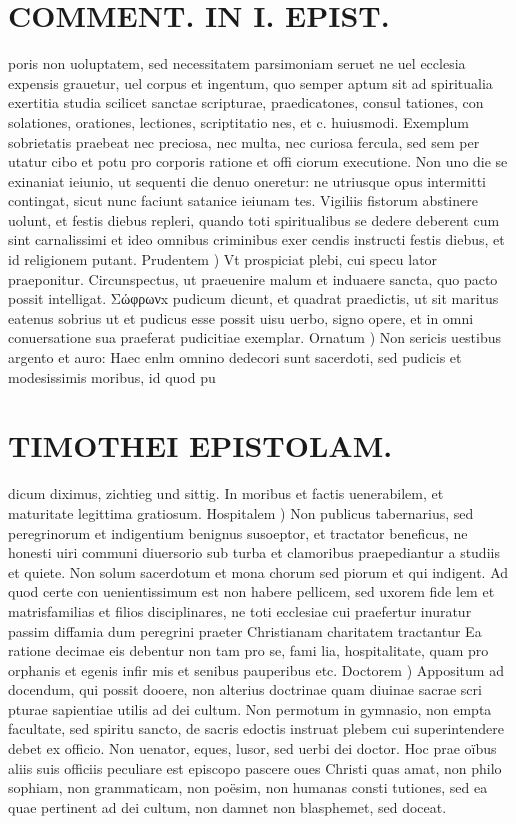 \documentclass{article}
\begin{document}
\begin{pages}
\section*{COMMENT. IN I. EPIST. }
\marginpar{[ p.74 ]}\pstart poris non uoluptatem, sed necessitatem parsimoniam seruet ne uel ecclesia expensis grauetur, uel corpus et ingentum, quo semper aptum sit ad spiritualia exertitia studia scilicet sanctae scripturae, praedicatones, consul tationes, con solationes, orationes, lectiones, scriptitatio nes, et c. huiusmodi. Exemplum sobrietatis praebeat nec preciosa, nec multa, nec curiosa fercula, sed sem per utatur cibo et potu pro corporis ratione et offi ciorum executione. Non uno die se exinaniat ieiunio, ut sequenti die denuo oneretur: ne utriusque opus intermitti contingat, sicut nunc faciunt satanice ieiunam tes. Vigiliis fistorum abstinere uolunt, et festis diebus repleri, quando toti spiritualibus se dedere deberent cum sint carnalissimi et ideo omnibus criminibus exer cendis instructi festis diebus, et id religionem putant.  \pend\pstart Prudentem ) Vt prospiciat plebi, cui specu lator praeponitur. Circunspectus, ut praeuenire malum et induaere sancta, quo pacto possit intelligat. Σώφρωνx pudicum dicunt, et quadrat praedictis, ut sit maritus eatenus sobrius ut et pudicus esse possit uisu uerbo, signo opere, et in omni conuersatione sua praeferat pudicitiae exemplar.  \pend\pstart Ornatum ) Non sericis uestibus argento et auro: Haec enlm omnino dedecori sunt sacerdoti, sed pudicis et modesissimis moribus, id quod pu\pend
\section*{TIMOTHEI EPISTOLAM. }
\marginpar{[ p.75 ]}\pstart dicum diximus, zichtieg und sittig. In moribus et factis uenerabilem, et maturitate legittima gratiosum.  \pend\pstart Hospitalem ) Non publicus tabernarius, sed peregrinorum et indigentium benignus susoeptor, et tractator beneficus, ne honesti uiri communi diuersorio sub turba et clamoribus praepediantur a studiis et quiete. Non solum sacerdotum et mona chorum sed piorum et qui indigent. Ad quod certe con uenientissimum est non habere pellicem, sed uxorem fide lem et matrisfamilias et filios disciplinares, ne toti ecclesiae cui praefertur inuratur passim diffamia dum peregrini praeter Christianam charitatem tractantur Ea ratione decimae eis debentur non tam pro se, fami lia, hospitalitate, quam pro orphanis et egenis infir mis et senibus pauperibus etc.  \pend\pstart Doctorem ) Appositum ad docendum, qui possit dooere, non alterius doctrinae quam diuinae sacrae scri pturae sapientiae utilis ad dei cultum. Non permotum in gymnasio, non empta facultate, sed spiritu sancto, de sacris edoctis instruat plebem cui superintendere debet ex officio. Non uenator, eques, lusor, sed uerbi dei doctor. Hoc prae oïbus aliis suis officiis peculiare est episcopo pascere oues Christi quas amat, non philo sophiam, non grammaticam, non poësim, non humanas consti tutiones, sed ea quae pertinent ad dei cultum, non damnet non blasphemet, sed doceat.  \pend

\end{pages}
\end{document}
